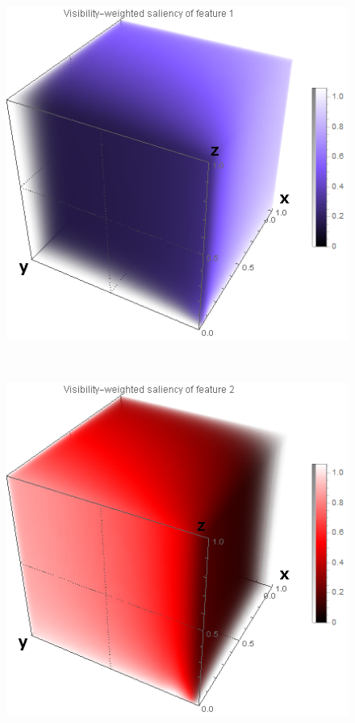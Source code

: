 \begin{figure}
	\centering
	\begin{minipage}{.3\textwidth}
		\includegraphics[width=1\linewidth]{images/nucleon_strong_red_densityplot1}
		\subcaption{}
	\end{minipage}~
	\begin{minipage}{.3\textwidth}
		\includegraphics[width=1\linewidth]{images/nucleon_strong_red_densityplot2}

\end{minipage}
\end{figure}
